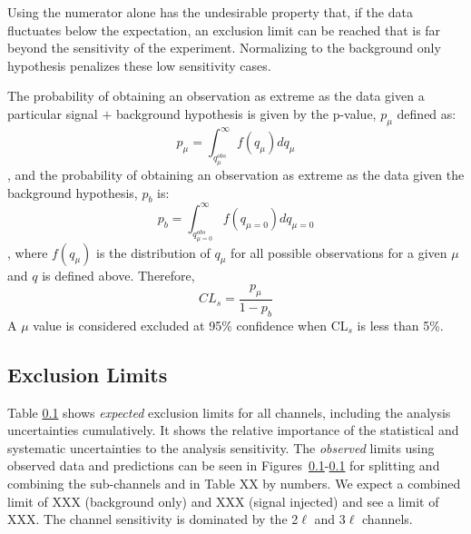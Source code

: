 Using the numerator alone has the undesirable property that, if the data fluctuates below the expectation, an exclusion limit can be reached that is far beyond the sensitivity of the experiment. Normalizing to the background only hypothesis penalizes these low sensitivity cases.

The probability of obtaining an observation as extreme as the data given a particular signal $+$ background hypothesis is given by the p-value, $p_{\mu}$ defined as:
\begin{equation}
 p_{\mu} = \int_{q_{\mu}^{obs}}^{\infty} f(q_{\mu}) dq_{\mu}
\end{equation}
, and the probability of obtaining an observation as extreme as the data given the background hypothesis, $p_b$ is:
\begin{equation}
 p_{b} = \int_{q_{\mu=0}^{obs}}^{\infty} f(q_{\mu=0}) dq_{\mu=0}
\end{equation}
, where $f(q_{\mu})$ is the distribution of $q_{\mu}$ for all possible observations for a given $\mu$ and $q$ is defined above. Therefore,
\begin{equation}
 CL_{s} = \frac{p_{\mu}}{1-p_b}
\end{equation}
A $\mu$ value is considered excluded at 95\% confidence when CL$_{s}$ is less than 5\%. 

\subsection{Exclusion Limits}

Table \ref{} shows \textit{expected} exclusion limits for all channels, including the analysis uncertainties cumulatively. It shows the relative importance of the statistical and systematic uncertainties to the analysis sensitivity. The \textit{observed} limits using observed data and predictions can be seen in Figures~\ref{}-\ref{} for splitting and combining the sub-channels and in Table XX by numbers. We expect a combined limit of XXX (background only) and XXX (signal injected) and see a limit of XXX. The channel sensitivity is dominated by the 2$\ell$ and 3$\ell$ channels.

